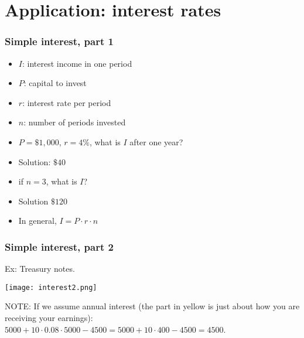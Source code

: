 \documentclass[xcolor=dvipsnames, 9pt]{beamer} %
\begin{document}

\section{Application: interest rates}

\begin{frame}
\frametitle{Simple interest, part 1}
\begin{itemize}
\item $I$: interest income in one period 
\item $P$: capital to invest
\item $r$: interest rate per period 
\item $n$: number of periods invested
\item $P = \$1,000$, $r = 4\%$, what is $I$ after one year?
\item Solution: $\$40$
\item if $n = 3$, what is $I$?
\item Solution $\$120$
\item In general, $I = P \cdot r \cdot n$
\end{itemize}
\end{frame}


\begin{frame}
\frametitle{Simple interest, part 2}

Ex: Treasury notes. 

\begin{center}
\hspace*{-0.4cm} \texttt{[image: interest2.png]}
\end{center}
\vspace{-1em} 
NOTE: If we assume annual interest (the part in yellow is just about how you are receiving your earnings):
$5000 + 10 \cdot 0.08 \cdot 5000 - 4500 = 5000 + 10 \cdot 400 - 4500 = 4500$. 

\end{frame}
\end{document}
